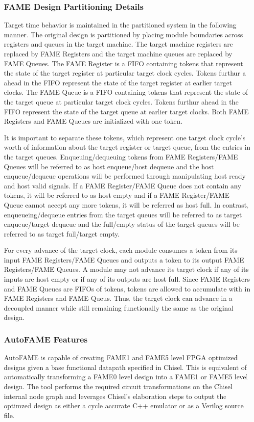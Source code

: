 \subsubsection{FAME Design Partitioning Details}
Target time behavior is maintained in the partitioned system in the following manner. The original design is partitioned by placing module boundaries across registers and queues in the target machine. The target machine registers are replaced by FAME Registers and the target machine queues are replaced by FAME Queues. The FAME Register is a FIFO containing tokens that represent the state of the target register at particular target clock cycles. Tokens furthur a ahead in the FIFO represent the state of the target register at earlier target clocks. The FAME Queue is a FIFO containing tokens that represent the state of the target queue at particular target clock cycles. Tokens furthur ahead in the FIFO represent the state of the target queue at earlier target clocks. Both FAME Registers and FAME Queues are initialized with one token. 

It is important to separate these tokens, which represent one target clock cycle's worth of information about the target register or target queue, from the entries in the target queues. Enqueuing/dequeuing tokens from FAME Registers/FAME Queues will be referred to as host enqueue/host dequeue and the host enqueue/dequeue operations will be performed through manipulating host ready and host valid signals. If a FAME Register/FAME Queue does not contain any tokens, it will be referred to as host empty and if a FAME Register/FAME Queue cannot accept any more tokens, it will be referred as host full. In contrast, enqueueing/dequeue entries from the target queues will be referred to as target enqueue/target dequeue and the full/empty status of the target queues will be referred to as target full/target empty.

For every advance of the target clock, each module consumes a token from its input FAME Registers/FAME Queues and outputs a token to its output FAME Registers/FAME Queues. A module may not advance its target clock if any of its inputs are host empty or if any of its outputs are host full. Since FAME Registers and FAME Queues are FIFOs of tokens, tokens are allowed to accumulate with in FAME Registers and FAME Queus. Thus, the target clock can advance in a decoupled manner while still remaining functionally the same as the original design. 

\subsubsection{AutoFAME Features}
AutoFAME is capable of creating FAME1 and FAME5 level FPGA optimized designs given a base functional datapath specified in Chisel. This is equivalent of automatically transforming a FAME0 level design into a FAME1 or FAME5 level design. The tool performs the required circuit transformations on the Chisel internal node graph and leverages Chisel's elaboration steps to output the optimzed design as either a cycle accurate C++ emulator or as a Verilog source file. 

